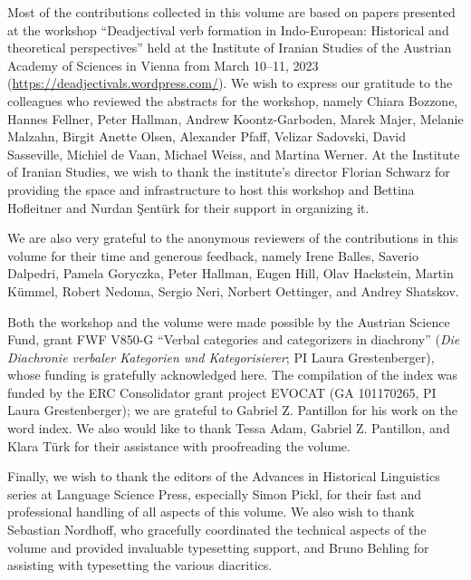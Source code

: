 \begin{refsection}

Most of the contributions collected in this volume are based on papers presented at the workshop ``Deadjectival verb formation in Indo-European: Historical and theoretical perspectives'' held at the Institute of Iranian Studies of the Austrian Academy of Sciences in Vienna from March 10--11, 2023 (\url{https://deadjectivals.wordpress.com/}). We wish to express our gratitude to the colleagues who reviewed the abstracts for the workshop, namely Chiara Bozzone, Hannes Fellner, Peter Hallman, 
Andrew Koontz-Garboden, Marek Majer,  
Melanie Malzahn, Birgit Anette Olsen, 
Alexander Pfaff, Velizar Sadovski, David Sasseville, 
Michiel de Vaan, 
Michael Weiss, and Martina Werner. At the Institute of Iranian Studies, we wish to thank the institute's director Florian Schwarz for providing the space and infrastructure to host this workshop and Bettina Hofleitner and Nurdan Şent\"urk  for their support in organizing it. 


We are also very grateful to the anonymous reviewers of the contributions in this volume for their time and generous feedback, namely Irene Balles, Saverio Dalpedri, Pamela Goryczka, Peter Hallman, Eugen Hill, Olav Hackstein, Martin K\"ummel, Robert Nedoma, Sergio Neri, Norbert Oettinger, and Andrey Shatskov. 



Both the workshop and the volume were made possible by the Austrian Science Fund,  grant FWF V850-G ``Verbal categories and categorizers in diachrony'' (\textit{Die Diachronie verbaler Kategorien und Kategorisierer}; PI Laura Grestenberger), whose funding is gratefully acknowledged here. The compilation of the index was funded by the ERC Consolidator grant project EVOCAT (GA 101170265, PI Laura Grestenberger); we are grateful to Gabriel Z. Pantillon for his work on the word index. We also would like to thank Tessa Adam, Gabriel Z. Pantillon, and Klara T\"urk for their assistance with proofreading the volume.  

Finally, we wish to thank the editors of the Advances in Historical Linguistics series at Language Science Press, especially Simon Pickl, for their fast and professional handling of all aspects of this volume. We also wish to thank Sebastian Nordhoff, who gracefully coordinated the technical aspects of the volume and provided invaluable typesetting support, and Bruno Behling for assisting with typesetting the various  diacritics.  

\end{refsection}

